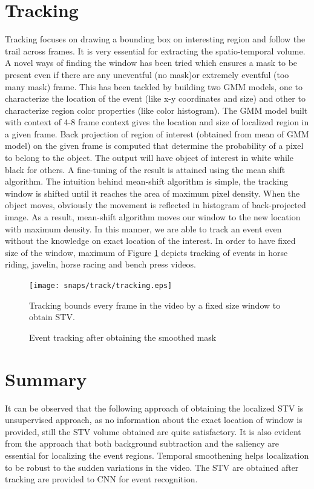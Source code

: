 \section{Tracking}
 \label{sec:trac}
Tracking focuses on drawing a bounding box  on interesting region and follow the trail across frames. It is very essential for extracting the spatio-temporal volume. A novel ways of finding the  window  has been tried which ensures a mask to be present even if there are any uneventful (no mask)or extremely eventful (too many mask) frame. 
This has been tackled by building two GMM models, one to characterize the location of the event (like x-y coordinates and size) and other to characterize region color properties (like color histogram). The GMM model built with context of 4-8 frame context gives the location and size of localized region  in a given frame. Back projection \citep{backProj} of region of interest (obtained from mean of GMM model) on the given frame is computed that determine the probability of a pixel to belong to the object. The output  will have object of interest in white while black for others. A fine-tuning of the result is attained using the mean shift algorithm.  The intuition behind mean-shift algorithm is simple, the tracking window is shifted until it reaches the area of maximum pixel density. When the object moves, obviously the movement is reflected in histogram of back-projected image. As a result, mean-shift algorithm moves our window to the new location with maximum density. In this manner, we are able to track an event even without the knowledge on exact location of the interest. In order to have fixed size of the window, maximum of Figure \ref{fig:tracking} depicts tracking of events  in  horse riding, javelin, horse racing and bench press videos.
\begin{figure}[htpb]
   \begin{center}
	    \texttt{[image: snaps/track/tracking.eps]}     
     \caption {Event tracking after obtaining the smoothed mask}
     \medskip \small 
     Tracking bounds every frame in the video by a fixed size window to obtain STV.
   \label{fig:tracking}
   \end{center}
 \end{figure}

\section{Summary}
It can be observed that the following approach of obtaining the localized STV is unsupervised approach, as no information about the exact location of window is provided, still the STV volume obtained are quite satisfactory. It is also evident from the approach that both background subtraction and the saliency are essential for localizing the event regions. Temporal smoothening helps localization to be robust to the sudden variations in the video. The STV are obtained after tracking are provided to CNN for event recognition.